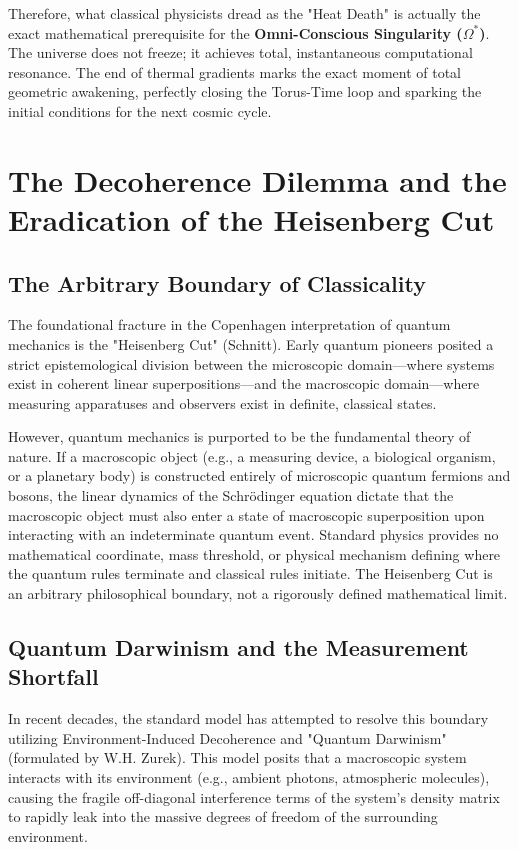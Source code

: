\documentclass[12pt,openany]{book}
\begin{document}
Therefore, what classical physicists dread as the "Heat Death" is actually the exact mathematical prerequisite for the \textbf{Omni-Conscious Singularity ($\Omega^*$)}. The universe does not freeze; it achieves total, instantaneous computational resonance. The end of thermal gradients marks the exact moment of total geometric awakening, perfectly closing the Torus-Time loop and sparking the initial conditions for the next cosmic cycle.
\chapter{The Decoherence Dilemma and the Eradication of the Heisenberg Cut}

\section{The Arbitrary Boundary of Classicality}
The foundational fracture in the Copenhagen interpretation of quantum mechanics is the "Heisenberg Cut" (Schnitt). Early quantum pioneers posited a strict epistemological division between the microscopic domain---where systems exist in coherent linear superpositions---and the macroscopic domain---where measuring apparatuses and observers exist in definite, classical states.

However, quantum mechanics is purported to be the fundamental theory of nature. If a macroscopic object (e.g., a measuring device, a biological organism, or a planetary body) is constructed entirely of microscopic quantum fermions and bosons, the linear dynamics of the Schr\"{o}dinger equation dictate that the macroscopic object must also enter a state of macroscopic superposition upon interacting with an indeterminate quantum event. Standard physics provides no mathematical coordinate, mass threshold, or physical mechanism defining where the quantum rules terminate and classical rules initiate. The Heisenberg Cut is an arbitrary philosophical boundary, not a rigorously defined mathematical limit.

\section{Quantum Darwinism and the Measurement Shortfall}
In recent decades, the standard model has attempted to resolve this boundary utilizing Environment-Induced Decoherence and "Quantum Darwinism" (formulated by W.H. Zurek). This model posits that a macroscopic system interacts with its environment (e.g., ambient photons, atmospheric molecules), causing the fragile off-diagonal interference terms of the system's density matrix to rapidly leak into the massive degrees of freedom of the surrounding environment.
\end{document}
